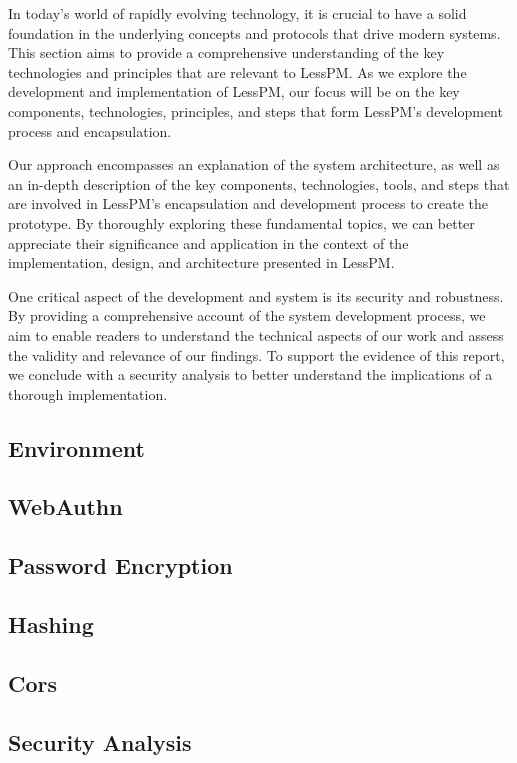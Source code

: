 
In today's world of rapidly evolving technology, it is crucial to have a
solid foundation in the underlying concepts and protocols that drive modern
systems.
This section aims to provide a comprehensive understanding of the key
technologies and principles that are relevant to LessPM\@.
As we explore the development and implementation of LessPM, our focus will be
on the key components, technologies, principles, and steps that form LessPM's
development process and encapsulation.

Our approach encompasses an explanation of the system architecture, as well as
an in-depth description of the key components, technologies, tools, and steps
that are involved in LessPM's encapsulation and development process to create
the prototype.
By thoroughly exploring these fundamental topics, we can better appreciate their
significance and application in the context of the implementation, design, and
architecture presented in LessPM\@.

One critical aspect of the development and system is its security and
robustness.
By providing a comprehensive account of the system development process, we aim
to enable readers to understand the technical aspects of our work and assess the
validity and relevance of our findings.
To support the evidence of this report, we conclude with a security analysis
to better understand the implications of a thorough implementation.

\subsection{Environment}\label{subsec:environment}


\subsection{WebAuthn}\label{subsec:webauthn-methodology}


\subsection{Password Encryption}\label{subsec:password-encryption}


\subsection{Hashing}\label{subsec:hashing}


\subsection{Cors}\label{subsec:cors}


\subsection{Security Analysis}\label{subsec:security-analysis}


